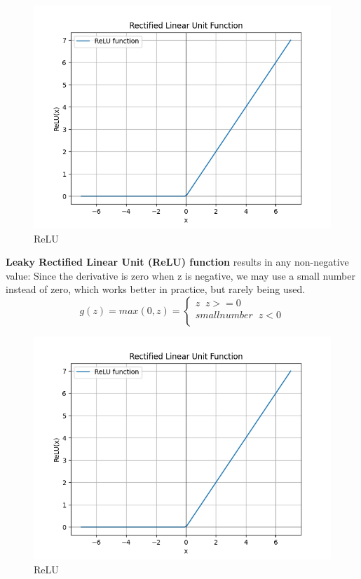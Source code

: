 \documentclass[12pt]{report}
\begin{document}
\begin{figure}[H]
  \centering
  \includegraphics[trim =0.0cm 0.0cm 0.0cm 0.0cm, clip, scale=0.5]{pics/ReLU.png}
  \caption{ReLU}
\end{figure}

\textbf{Leaky Rectified Linear Unit (ReLU) function} results in any non-negative value:
Since the derivative is zero when z is negative, we may use a small number instead of zero, which works better in practice, but rarely being used.
\begin{equation}
  g(z) = max (0,z) =
  \begin{cases}
    z \;\; z >= 0  \\
    small number \;\; z < 0 \\
  \end{cases}
\end{equation}

\begin{figure}[H]
  \centering
  \includegraphics[trim =0.0cm 0.0cm 0.0cm 0.0cm, clip, scale=0.5]{pics/ReLU.png}
  \caption{ReLU}
\end{figure}
\end{document}
